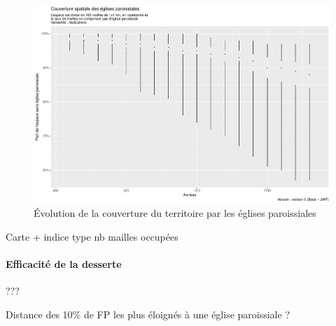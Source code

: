 \begin{figure}[H]
	\captionsetup{width=\linewidth}
	\includegraphics[width=\linewidth]{img/resultats/v0_paroisses_occupation.pdf}
	\caption{Évolution de la couverture du territoire par les églises paroissiales} 
	\label{fig:couverture-paroisses-v0} 
\end{figure}
Carte + indice type nb mailles occupées

\paragraph{Efficacité de la desserte}

\begin{mdframed}[backgroundcolor=gray!10,footnoteinside=false]
	???
\end{mdframed}

Distance des 10\% de FP les plus éloignés à une église paroissiale ?

